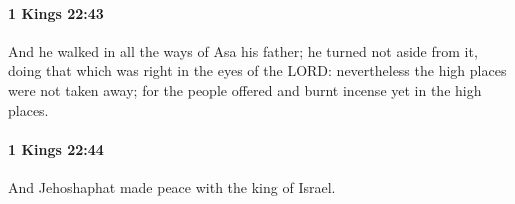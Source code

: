 		\paragraph{1 Kings 22:43} %
			\label{1KINGS-22-43}

			And he walked in all the ways of Asa his father; he turned not aside from it, doing that which was right in the eyes of the LORD: nevertheless the high places were not taken away; for the people offered and burnt incense yet in the high places.


		\paragraph{1 Kings 22:44} %
			\label{1KINGS-22-44}

			And Jehoshaphat made peace with the king of Israel.


